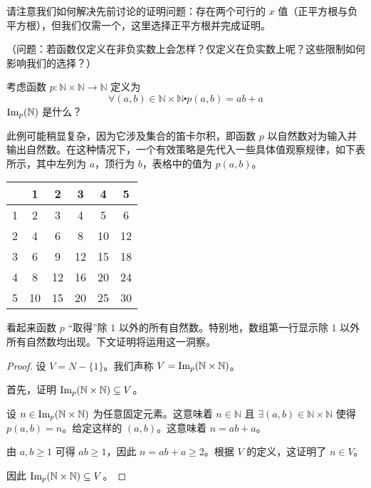 请注意我们如何解决先前讨论的证明问题：存在两个可行的 $x$ 值（正平方根与负平方根），但我们仅需一个，这里选择正平方根并完成证明。

（问题：若函数仅定义在非负实数上会怎样？仅定义在负实数上呢？这些限制如何影响我们的选择？）\\

\begin{example}
    考虑函数 $p:\mathbb{N} \times \mathbb{N} \to \mathbb{N}$ 定义为
    \[\forall (a, b) \in \mathbb{N} \times \mathbb{N} \centerdot p(a, b) = ab + a\]
    $\text{Im}_p(\mathbb{N})$ 是什么？

    此例可能稍显复杂，因为它涉及集合的笛卡尔积，即函数 $p$ 以自然数对为输入并输出自然数。在这种情况下，一个有效策略是先代入一些具体值观察规律，如下表所示，其中左列为 $a$，顶行为 $b$，表格中的值为 $p(a,b)$。

    \begin{center}
        \begin{tabular}{c|ccccc}
              &  1 &  2 &  3 &  4 &  5 \\
            \hline
            1 &  2 &  3 &  4 &  5 &  6 \\
            2 &  4 &  6 &  8 & 10 & 12 \\
            3 &  6 &  9 & 12 & 15 & 18 \\
            4 &  8 & 12 & 16 & 20 & 24 \\
            5 & 10 & 15 & 20 & 25 & 30 \\
        \end{tabular}
    \end{center}

    看起来函数 $p$ ``取得''除 $1$ 以外的所有自然数。特别地，数组第一行显示除 $1$ 以外所有自然数均出现。下文证明将运用这一洞察。

    \begin{proof}
        设 $V = N - \{1\}$。我们声称 $V = \text{Im}_p(\mathbb{N} \times \mathbb{N})$。

        首先，证明 $\text{Im}_p(\mathbb{N} \times \mathbb{N}) \subseteq V$。

        设 $n \in \text{Im}_p(\mathbb{N} \times \mathbb{N})$ 为任意固定元素。这意味着 $n \in \mathbb{N}$ 且 $\exists (a,b) \in \mathbb{N} \times \mathbb{N}$ 使得 $p(a,b)=n$。给定这样的 $(a,b)$。这意味着 $n=ab+a$。
        
        由 $a,b \ge 1$ 可得 $ab \ge 1$，因此 $n = ab + a \ge 2$。根据 $V$ 的定义，这证明了 $n \in V$。

        因此 $\text{Im}_p(\mathbb{N} \times \mathbb{N}) \subseteq V$。


\end{proof}
\end{example}
